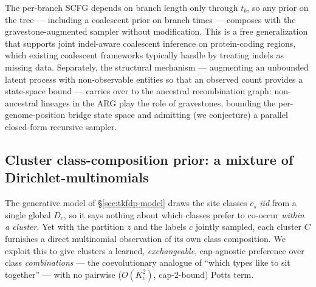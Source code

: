\begin{remark}
The per-branch SCFG depends on branch length only through $t_b$, so
any prior on the tree --- including a coalescent prior on branch
times --- composes with the gravestone-augmented sampler without
modification. This is a free generalization that supports joint
indel-aware coalescent inference on protein-coding regions, which
existing coalescent frameworks typically handle by treating indels
as missing data. Separately, the structural mechanism --- augmenting
an unbounded latent process with non-observable entities so that an
observed count provides a state-space bound --- carries over to the
ancestral recombination graph: non-ancestral lineages in the ARG
play the role of gravestones, bounding the per-genome-position bridge
state space and admitting (we conjecture) a parallel closed-form
recursive sampler.
\end{remark}

\subsection{Cluster class-composition prior: a mixture of Dirichlet-multinomials}
\label{sec:dm-mixture}

The generative model of \S\ref{sec:tkfdp-model} draws the site classes $c_s$
\emph{iid} from a single global $D_c$, so it says nothing about which classes
prefer to co-occur \emph{within a cluster}. Yet with the partition $z$ and the
labels $c$ jointly sampled, each cluster $C$ furnishes a direct multinomial
observation of its own class composition. We exploit this to give clusters a
learned, \emph{exchangeable}, cap-agnostic preference over class
\emph{combinations} --- the coevolutionary analogue of ``which types like to
sit together'' --- with no pairwise ($O(K_c^2)$, cap-2-bound) Potts term.

